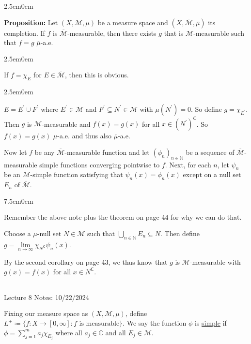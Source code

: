 \documentclass{book}
\newcommand{\hOne}{%
   \color{Black}%
   \fontsize{14}{16}\selectfont%
}
\newcommand{\hTwo}{%
\color{MidnightBlue}%
   \fontsize{13}{15}\selectfont%
}
\newcommand{\hThree}{%
   \color{PineGreen!85!Orange}
   \fontsize{12}{14}\selectfont%
}
\newcommand{\hFour}{%
   \color{Cyan!80!black}
   \fontsize{12}{14}\selectfont%
}
\newcommand{\myComment}{%
   \color{RawerSienna}%
   \fontsize{12}{14}\selectfont%
}
\newenvironment{myIndent}{%
   \begin{adjustwidth}{2.5em}{0em}%
}{%
   \end{adjustwidth}%
}
\newenvironment{myTindent}{%
   \begin{adjustwidth}{7.5em}{0em}%
}{%
   \end{adjustwidth}%
}
\newcommand{\udefine}[1]{{%
   \setulcolor{Red}%
   \setul{0.14em}{0.07em}%
   \ul{#1}%
}}
\newcommand{\blab}[1]{\textbf{#1}}
\newcommand{\comp}{\mathsf{C}}
\newcommand{\mySepTwo}[1][.]{%
   {\noindent\color{#1}{\rule{6.5in}{0.5mm}}}\\%
}
\newcommand{\retTwo}{\hfill\bigbreak}
\newcommand{\mHeader}[1]{{
   \color{Black}%
   \fontsize{20}{18}\selectfont%
   #1\retTwo
}}
\begin{document}
\hOne
\begin{myIndent}\hTwo
   \blab{Proposition:} Let $(X, \mathcal{M}, \mu)$ be a measure space and $(X, \overline{\mathcal{M}}, \overline{\mu})$ its completion. If $f$ is $\overline{\mathcal{M}}$-measurable, then there exists $g$ that is $\mathcal{M}$-measurable such that $f = g$ $\overline{\mu}$-a.e.

   \begin{myIndent}\hThree
      If $f = \chi_E$ for $E \in \overline{\mathcal{M}}$, then this is obvious.
      \begin{myIndent}\hFour
         $E = E^\prime \cup F^\prime$ where $E^\prime \in \mathcal{M}$ and $F^\prime \subseteq N^\prime \in \mathcal{M}$ with $\mu(N^\prime) = 0$. So define $g = \chi_{E^\prime}$. Then $g$ is $\mathcal{M}$-measurable and $f(x) = g(x)$ for all $x \in (N^\prime)^\comp$. So $f(x) = g(x)$ $\mu$-a.e. and thus also $\overline{\mu}$-a.e.\retTwo
      \end{myIndent}

      Now let $f$ be any $\overline{\mathcal{M}}$-measurable function and let $(\phi_n)_{n\in\mathbb{N}}$ be a sequence of $\overline{\mathcal{M}}$-measurable simple functions converging pointwise to $f$. Next, for each $n$, let $\psi_n$ be an $\mathcal{M}$-simple function satisfying that $\psi_n(x) = \phi_n(x)$ except on a null set $E_n$ of $\overline{\mathcal{M}}$.
      
      \begin{myTindent}\myComment
         Remember the above note plus the theorem on page 44 for why we can do that.\retTwo
      \end{myTindent}

      Choose a $\mu$-null set $N \in \mathcal{M}$ such that $\bigcup\limits_{n \in \mathbb{N}}E_n \subseteq N$. Then define $g = \lim\limits_{n \rightarrow \infty} \chi_{N^\comp}\psi_n(x)$.\retTwo

      By the second corollary on page 43, we thus know that $g$ is $\mathcal{M}$-measurable with $g(x) = f(x)$ for all $x \in N^\comp$.
   \end{myIndent}
\end{myIndent}

\mySepTwo

\mHeader{Lecture 8 Notes: 10/22/2024}

Fixing our measure space as $(X, \mathcal{M}, \mu)$, define $L^+ \coloneq \{f: X \to [0, \infty] : f \text{ is measurable}\}$. We say the function $\phi$ is \udefine{simple} if $\phi = \sum_{j=1}^m a_j \chi_{E_j}$ where all $a_j \in \mathbb{C}$ and all $E_j \in \mathcal{M}$.\retTwo
\end{document}
